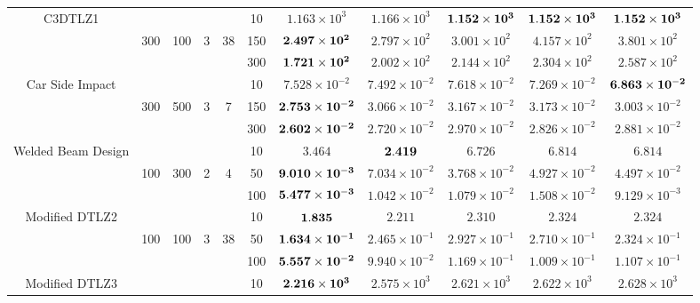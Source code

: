 \documentclass[../main/main]{subfiles}
\begin{document}
\begin{table}[htbp]
\begin{tabular}{c|ccccc|c|c|c|c|c}
\hline
\multirow{3}{*}{C3DTLZ1} &       && &       & 10 &  $1.163 \times 10^{3}$ & $1.166 \times 10^{3}$ &  $\bf{1.152 \times 10^{3}}$ & $\bf{1.152 \times 10^{3}}$ & $\bf{1.152 \times 10^{3}}$\\
                                          &300 & 100 & 3 & 38 &150 & $\bf{2.497 \times 10^{2}}$ & $2.797 \times 10^{2}$ &  $3.001 \times 10^{2}$ & $4.157 \times 10^{2}$ & $3.801 \times 10^{2}$\\
				   &        &    &&    &300 &  $\bf{1.721 \times 10^{2}}$ & $2.002 \times 10^{2}$ &  $2.144 \times 10^{2}$ & $2.304 \times 10^{2}$ & $2.587 \times 10^{2}$\\
				   \hline
\multirow{3}{*}{\scriptsize Car Side Impact}&  &&      &       & 10 &$7.528 \times 10^{-2}$ & $7.492 \times 10^{-2}$ & $7.618 \times 10^{-2}$ & $7.269 \times 10^{-2}$ & $\bf{6.863 \times 10 ^{-2}}$\\
  				   & 300 & 500 & 3 & 7 &150 &$\bf{2.753 \times 10^{-2}}$ &  $3.066 \times 10^{-2}$ & $3.167 \times 10^{-2}$ & $3.173 \times 10^{-2}$ & $3.003 \times 10^{-2}$\\
				   &        &      &&  &300 & $\bf{2.602 \times 10^{-2}}$ & $2.720 \times 10^{-2}$ & $2.970 \times 10^{-2}$ & $2.826 \times 10^{-2}$ & $2.881 \times 10^{-2}$\\
\hline
\multirow{3}{*}{\fontsize{6pt}{0pt}\selectfont Welded Beam Design} & &&       &       & 10 &$3.464$& $\bf{2.419}$ & $6.726$ & $6.814$ & $6.814$\\
  				   & 100 & 300 & 2 & 4 &50 &$\bf{9.010 \times 10^{-3}}$ & $7.034 \times 10^{-2}$ & $3.768 \times 10^{-2}$ & $4.927 \times 10^{-2}$ & $4.497 \times 10^{-2}$\\
				   &        &      &&  &100 &$\bf{5.477 \times 10^{-3}}$ & $1.042 \times 10^{-2}$ & $1.079 \times 10^{-2}$ & $1.508 \times 10^{-2}$ & $9.129 \times 10^{-3}$\\
\hline
\multirow{3}{*}{\fontsize{6.5pt}{0pt}\selectfont Modified DTLZ2} & &&       &       & 10 &$\bf{1.835}$ & $2.211$ & $2.310$ & $2.324$ & $2.324$\\
  				   & 100 & 100 & 3 & 38 &50 &$\bf{1.634 \times 10^{-1}}$ &  $2.465 \times 10^{-1}$ & $2.927 \times 10^{-1}$ & $2.710 \times 10^{-1}$ & $2.324 \times 10^{-1}$\\
				   &        &      &&  &100 & $\bf{5.557 \times 10^{-2}}$ & $9.940 \times 10^{-2}$ & $1.169 \times 10^{-1}$ & $1.009 \times 10^{-1}$ & $1.107 \times 10^{-1}$\\
\hline
\multirow{3}{*}{\fontsize{6.5pt}{0pt}\selectfont Modified DTLZ3} & &&       &       & 10 &$\bf{2.216 \times 10^{3}}$ & $2.575 \times 10^{3}$ & $2.621 \times 10^{3}$ & $2.622 \times 10^{3}$ & $2.628 \times 10 ^{3}$\\

\end{tabular}
\end{table}
\end{document}
